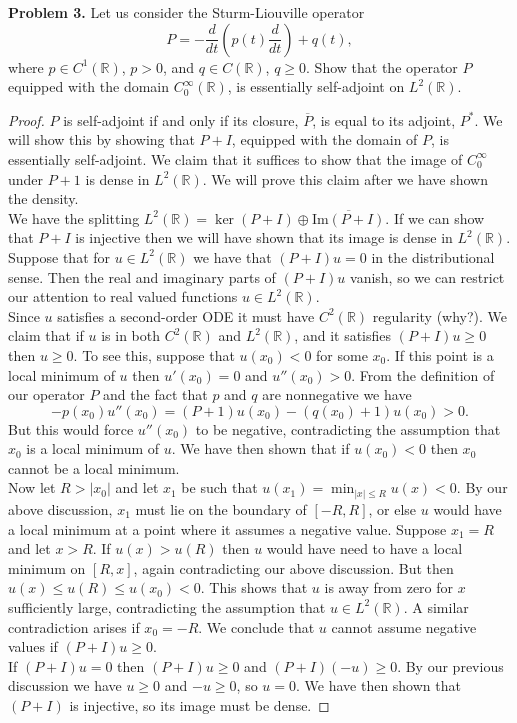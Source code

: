 \documentclass[11pt,letterpaper]{report}
\newcommand{\reals}{\mathbb{R}}
\newcommand{\im}{\text{Im}}
\begin{document}
\noindent\textbf{Problem 3. }Let us consider the Sturm-Liouville operator
\[
P = -\frac{d}{dt}\left(p(t)\frac{d}{dt}\right)+q(t),
\]
where $p\in C^1(\reals)$, $p>0$, and $q\in C(\reals)$, $q\geq 0$. Show that the operator $P$ equipped with the domain $C_0^\infty(\reals)$, is essentially self-adjoint on $L^2(\reals)$.
\begin{proof}
	$P$ is self-adjoint if and only if its closure, $\overline{P}$, is equal to its adjoint, $P^*$. We will show this by showing that $P+I$, equipped with the domain of $P$, is essentially self-adjoint. We claim that it suffices to show that the image of $C_0^\infty$ under $P+1$ is dense in $L^2(\reals)$. We will prove this claim after we have shown the density.\\

	\noindent We have the splitting $L^2(\reals) = \ker(P+I) \oplus \overline{\im(P+I)}$. If we can show that $P+I$ is injective then we will have shown that its image is dense in $L^2(\reals)$. Suppose that for $u\in L^2(\reals)$ we have that $(P+I)u = 0$ in the distributional sense. Then the real and imaginary parts of $(P+I)u$ vanish, so we can restrict our attention to real valued functions $u\in L^2(\reals)$.\\

	\noindent Since $u$ satisfies a second-order ODE it must have $C^2(\reals)$ regularity (why?). We claim that if $u$ is in both $C^2(\reals)$ and $L^2(\reals)$, and it satisfies $(P+I)u \geq 0$ then $u\geq 0$. To see this, suppose that $u(x_0)<0$ for some $x_0$. If this point is a local minimum of $u$ then $u'(x_0) = 0$ and $u''(x_0)>0$. From the definition of our operator $P$ and the fact that $p$ and $q$ are nonnegative we have
	\[
	-p(x_0)u''(x_0) = (P+1)u(x_0)-(q(x_0)+1)u(x_0) > 0.
	\]
	But this would force $u''(x_0)$ to be negative, contradicting the assumption that $x_0$ is a local minimum of $u$. We have then shown that if $u(x_0)<0$ then $x_0$ cannot be a local minimum.\\

	\noindent Now let $R>|x_0|$ and let $x_1$ be such that $u(x_1) = \min_{|x|\leq R}u(x)<0$. By our above discussion, $x_1$ must lie on the boundary of $[-R, R]$, or else $u$ would have a local minimum at a point where it assumes a negative value. Suppose $x_1 = R$ and let $x>R$. If $u(x)>u(R)$ then $u$ would have need to have a local minimum on $[R, x]$, again contradicting our above discussion. But then $u(x)\leq u(R)\leq u(x_0)<0$. This shows that $u$ is away from zero for $x$ sufficiently large, contradicting the assumption that $u\in L^2(\reals)$. A similar contradiction arises if $x_0 = -R$. We conclude that $u$ cannot assume negative values if $(P+I)u \geq 0$.\\

	\noindent If $(P+I)u = 0$ then $(P+I)u\geq 0$ and $(P+I)(-u)\geq 0$. By our previous discussion we have $u\geq 0$ and $-u\geq 0$, so $u = 0$. We have then shown that $(P+I)$ is injective, so its image must be dense.
\end{proof}
\end{document}
